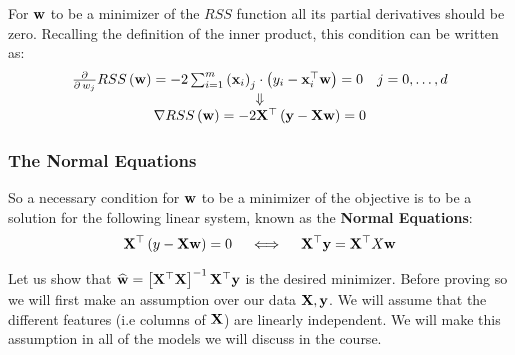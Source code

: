 For $\mathbf{w}$ to be a minimizer of the $RSS$ function all its partial derivatives should be zero. Recalling the definition of the inner product, this condition can be written as: 
$$
\begin{array}{c}
\frac{\partial}{\partial \, w_j}RSS\left(\mathbf{w}\right)=-2\sum^m_{i=1}\left(\mathbf{x}_i\right)_j\cdot\left(y_i-\mathbf{x}_i^\top\mathbf{w}\right)=0\quad j=0,\ldots,d 	\\
\Downarrow	\\
\nabla RSS\left(\mathbf{w}\right)=-2\mathbf{X}^\top\left(\mathbf{y}-\mathbf{X}\mathbf{w}\right)=0	\\
\end{array}
$$


\subsubsection{The Normal Equations}
So a necessary condition for $\mathbf{w}$ to be a minimizer of the objective is to be a solution for the following linear system, known as the \textbf{Normal Equations}:
\begin{equation}
\mathbf{X}^\top\left(y-\mathbf{X}\mathbf{w}\right)=0 \quad \iff \quad \mathbf{X}^\top\mathbf{y}=\mathbf{X}^\top X\mathbf{w}
\label{eqn:normal_eq}
\end{equation}

Let us show that $\widehat{\mathbf{w}}=\left[\mathbf{X}^\top\mathbf{X}\right]^{-1}\mathbf{X}^\top\mathbf{y}$ is the desired minimizer. Before proving so we will first make an assumption over our data $\mathbf{X},\mathbf{y}$. We will assume that the different features (i.e columns of $\mathbf{X}$) are linearly independent. We will make this assumption in all of the models we will discuss in the course.

